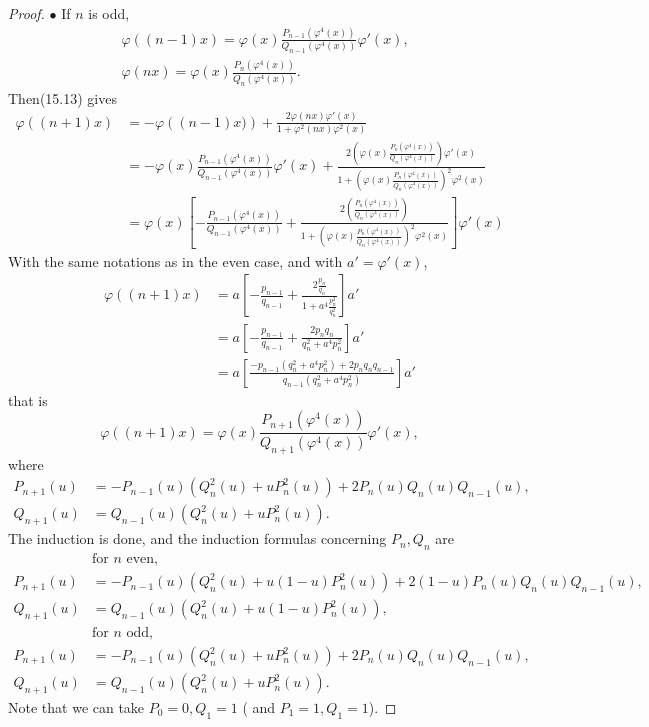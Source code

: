 \documentclass[11pt,a4paper]{article}
\begin{document}
\begin{proof}
\qquad

$\bullet$ If $n$ is odd,
\begin{align*}
& \varphi((n-1)x) = \varphi(x)\frac{P_{n-1}\left(\varphi^4(x)\right)}{Q_{n-1}\left(\varphi^4(x)\right)} \varphi'(x), \\
 &\varphi(nx) = \varphi(x)\frac{P_{n}\left(\varphi^4(x)\right)}{Q_{n}\left(\varphi^4(x)\right)} .
  \end{align*}
  Then(15.13) gives
  \begin{align*}
\varphi\left((n+1)x\right) &= - \varphi\left( (n-1)x) \right) + \frac{2 \varphi(nx) \varphi'(x)}{1+\varphi^2(nx) \varphi^2(x)}\\
&=- \varphi(x) \frac{P_{n-1}\left(\varphi^4(x)\right)}{Q_{n-1}\left(\varphi^4(x)\right)}  \varphi'(x)+ \frac{2 \left(\varphi(x)\frac{P_{n}\left(\varphi^4(x)\right)}{Q_{n}\left(\varphi^4(x)\right)}  \right) \varphi'(x)}{1+\left(\varphi(x)\frac{P_{n}\left(\varphi^4(x)\right)}{Q_{n}\left(\varphi^4(x)\right)}  \right)^2 \varphi^2(x)}\\
&=\varphi(x) \left[ -  \frac{P_{n-1}\left(\varphi^4(x)\right)}{Q_{n-1}\left(\varphi^4(x)\right)} + \frac{2 \left(\frac{P_{n}\left(\varphi^4(x)\right)}{Q_{n}\left(\varphi^4(x)\right)}  \right) }{1+\left(\varphi(x)\frac{P_{n}\left(\varphi^4(x)\right)}{Q_{n}\left(\varphi^4(x)\right)}  \right)^2 \varphi^2(x)}\right] \varphi'(x)
\end{align*}
With the same notations as in the even case, and with $a' = \varphi'(x)$, 
\begin{align*}
\varphi\left((n+1)x\right)&= a \left[ -\frac{p_{n-1}}{q_{n-1}} + \frac{2 \frac{p_n}{q_n}}{1 + a^4 \frac{p_n^2}{q_n^2}}\right] a'\\
&= a \left[ -\frac{p_{n-1}}{q_{n-1}}  +\frac{ 2 p_n q_n}{q_n^2 + a^4 p_n^2}\right] a' \\
&=a\left[ \frac{-p_{n-1} (q_n^2 + a^4 p_n^2) + 2 p_nq_nq_{n-1}} {q_{n-1}(q_n^2 + a^4 p_n^2)}\right] a'
\end{align*}
that is
$$\varphi\left((n+1)x\right) = \varphi(x) \frac{P_{n+1}(\varphi^4(x))}{Q_{n+1}(\varphi^4(x))}\varphi'(x),$$
where
\begin{align*}
P_{n+1}(u) &= -P_{n-1}(u) (Q_n^2(u) + u P_n^2(u)) + 2 P_n(u)Q_n(u) Q_{n-1}(u),\\
Q_{n+1}(u) &=Q_{n-1}(u)(Q_n^2(u) + u P_n^2(u)).
\end{align*}
The induction is done, and the induction formulas concerning $P_{n}, Q_{n}$ are
$$\begin{array}{ll}
&\text {for } n \text { even},\\
P_{n+1}(u) &= -P_{n-1}(u) (Q_n^2(u) + u(1-u) P_n^2(u)) + 2(1-u) P_n(u)Q_n(u) Q_{n-1}(u),\\
Q_{n+1}(u) &=Q_{n-1}(u)(Q_n^2(u) + u(1-u) P_n^2(u)),\\
&\text {for } n \text { odd},\\
P_{n+1}(u) &= -P_{n-1}(u) (Q_n^2(u) + u P_n^2(u)) + 2 P_n(u)Q_n(u) Q_{n-1}(u),\\
Q_{n+1}(u) &=Q_{n-1}(u)(Q_n^2(u) + u P_n^2(u)).
\end{array}
$$
Note that we can take $P_0 = 0, Q_1 = 1$ ( and $P_1 = 1, Q_1 = 1$).


\end{proof}
\end{document}

